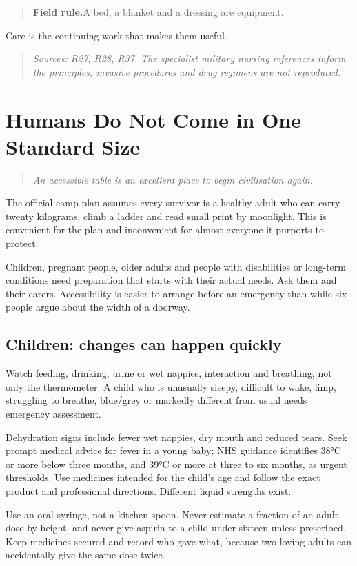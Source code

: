 \documentclass[10pt,openright]{book}
\newcommand{\fieldrule}[1]{\begin{quote}\textbf{Field rule.}\enspace #1\end{quote}}
\begin{document}
\fieldrule{A bed, a blanket and a dressing are equipment.}
Care is the continuing work that makes them useful.

\begin{quote}\emph{Sources: R27, R28, R37. The specialist military nursing references inform the principles; invasive procedures and drug regimens are not reproduced.}\end{quote}

\chapter{Humans Do Not Come in One Standard Size}
\begin{quote}\emph{An accessible table is an excellent place to begin civilisation again.}\end{quote}
The official camp plan assumes every survivor is a healthy adult who can carry twenty kilograms, climb a ladder and read small print by moonlight. This is convenient for the plan and inconvenient for almost everyone it purports to protect.

Children, pregnant people, older adults and people with disabilities or long-term conditions need preparation that starts with their actual needs. Ask them and their carers. Accessibility is easier to arrange before an emergency than while six people argue about the width of a doorway.

\section*{Children: changes can happen quickly}
Watch feeding, drinking, urine or wet nappies, interaction and breathing, not only the thermometer. A child who is unusually sleepy, difficult to wake, limp, struggling to breathe, blue/grey or markedly different from usual needs emergency assessment.

Dehydration signs include fewer wet nappies, dry mouth and reduced tears. Seek prompt medical advice for fever in a young baby; NHS guidance identifies 38°C or more below three months, and 39°C or more at three to six months, as urgent thresholds. Use medicines intended for the child's age and follow the exact product and professional directions. Different liquid strengths exist.

Use an oral syringe, not a kitchen spoon. Never estimate a fraction of an adult dose by height, and never give aspirin to a child under sixteen unless prescribed. Keep medicines secured and record who gave what, because two loving adults can accidentally give the same dose twice.
\end{document}
